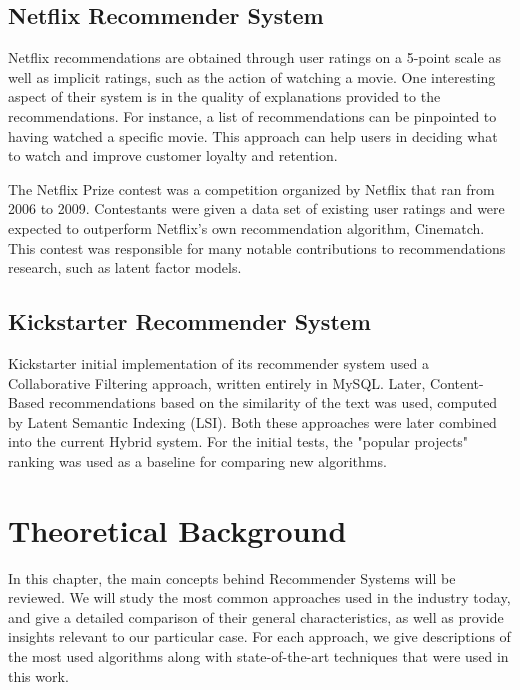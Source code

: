 \documentclass[cic,tc,english]{iiufrgs}
\begin{document}
\section{Netflix Recommender System}
Netflix recommendations are obtained through user ratings on a 5-point scale as well as implicit ratings, such as the action of watching a movie. One interesting aspect of their system is in the quality of explanations provided to the recommendations. For instance, a list of recommendations can be pinpointed to having watched a specific movie. This approach can help users in deciding what to watch and improve customer loyalty and retention.

The Netflix Prize contest was a competition organized by Netflix that ran from 2006 to 2009. Contestants were given a data set of existing user ratings and were expected to outperform Netflix's own recommendation algorithm, Cinematch. This contest was responsible for many notable contributions to recommendations research, such as latent factor models.
\section{Kickstarter Recommender System}
Kickstarter initial implementation of its recommender system used a Collaborative Filtering approach, written entirely in MySQL. Later, Content-Based recommendations based on the similarity of the text was used, computed by Latent Semantic Indexing (LSI). Both these approaches were later combined into the current Hybrid system. For the initial tests, the "popular projects" ranking was used as a baseline for comparing new algorithms.

\chapter{Theoretical Background}
In this chapter, the main concepts behind Recommender Systems will be reviewed. We will study the most common approaches used in the industry today, and give a detailed comparison of their general characteristics, as well as provide insights relevant to our particular case. For each approach, we give descriptions of the most used algorithms along with state-of-the-art techniques that were used in this work.
\end{document}
